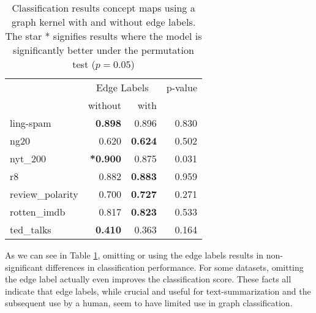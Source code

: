 \begin{table}[htb!]
    \centering
\begin{tabular}{lrrr}
\toprule
    {} & \multicolumn{2}{c}{Edge Labels}  & p-value \\
    {}  & without & with & {} \\
    \midrule
        ling-spam       & \textbf{0.898} & 0.896 & 0.830 \\
        ng20            & 0.620 & \textbf{0.624} & 0.502 \\
        nyt\_200         & \textbf{*0.900} & 0.875 & 0.031 \\
        r8              & 0.882 & \textbf{0.883} & 0.959 \\
        review\_polarity & 0.700 & \textbf{0.727} & 0.271 \\
        rotten\_imdb     & 0.817 & \textbf{0.823} & 0.533 \\
        ted\_talks       & \textbf{0.410} & 0.363 & 0.164 \\
    \bottomrule
\end{tabular}
\caption[Results: Graph Kernel with and without edge labels]{Classification results concept maps using a graph kernel with and without edge labels.  The star * signifies results where the model is significantly better under the permutation test ($p = 0.05$)}\label{table:edge_label_classification}
\end{table}

As we can see in Table \ref{table:edge_label_classification}, omitting or using the edge labels results in non-significant differences in classification performance.
For some datasets, omitting the edge label actually even improves the classification score.
These facts all indicate that edge labels, while crucial and useful for text-summarization and the subsequent use by a human, seem to have limited use in graph classification.

